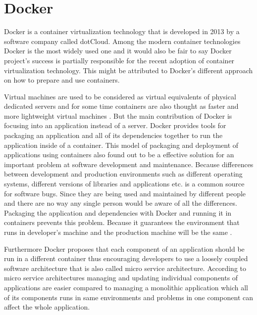 \documentclass[12pt,oneandhalf,chaparabic,ceng,ms,eng,oneside,pntc]{gsufbe}
\begin{document}
\section{Docker}
Docker is a container virtualization technology \cite{docker} that is developed in 2013 by a software
company called
dotCloud. Among the modern container technologies Docker is the most widely used one and it would also
be fair to say Docker project's success is partially responsible for the recent adoption of container
virtualization technology. This might be attributed to Docker's different approach on how to prepare 
and use containers.

Virtual machines are used to be considered as virtual equivalents of physical dedicated servers and for
some time containers are also thought as faster and more lightweight virtual machines
\cite{adufu_is_2015}. But the main
contribution of Docker is focusing into an application instead of a server. Docker provides tools for
packaging an application and all of its dependencies together to run the application inside of a
container. This model of packaging and deployment of applications using containers also found out to be
a effective solution for an important problem at software development and maintenance. Because 
differences between development and production environments such as different operating systems, 
different versions of libraries and applications etc. is a common source for software bugs. Since they
are being used and  maintained by different people and there are no way any single person would be
aware of all the differences. Packaging the application and dependencies with Docker and running it in
containers prevents this problem. Because it guarantees the environment that runs in developer’s
machine and the production machine will be the same \cite{boettiger_introduction_2015}.

Furthermore Docker proposes that each component of an application should be run in a 
different container thus encouraging developers to use a loosely coupled software architecture that is 
also called micro service architecture. According to micro service architectures managing and updating
individual components of applications are easier compared to managing a monolithic application which
all of its components runs in same environments and problems in one component can affect the whole
application.
\end{document}
